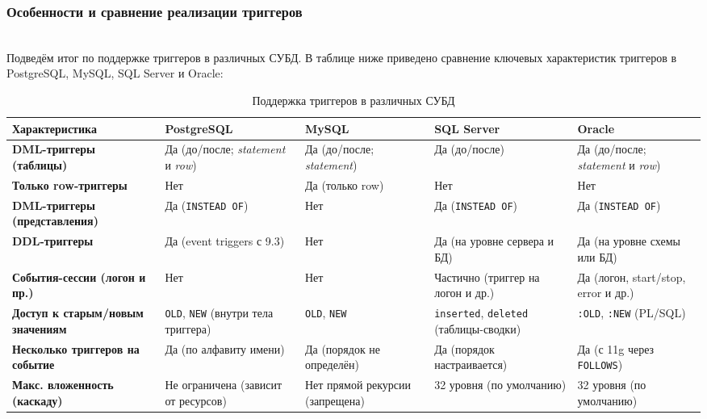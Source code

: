 \subsubsection{Особенности и сравнение реализации триггеров} ~\\

Подведём итог по поддержке триггеров в различных СУБД. В таблице ниже приведено сравнение ключевых характеристик триггеров в PostgreSQL, MySQL, SQL Server и Oracle:

\begin{table}[H]
    \centering
    \renewcommand{\arraystretch}{1.2} 
    \begin{tabular}{|>{\raggedright\arraybackslash}p{3.5cm} | p{3.2cm} | p{3cm} | p{3cm} | p{3cm}|}
        \hline
        \textbf{Характеристика} & \textbf{PostgreSQL} & \textbf{MySQL} & \textbf{SQL Server} & \textbf{Oracle} \\
        \hline
        \textbf{DML-триггеры (таблицы)} & Да (до/после; \textit{statement} и \textit{row}) & Да (до/после; \textit{statement}) & Да (до/после) & Да (до/после; \textit{statement} и \textit{row}) \\
        \hline
        \textbf{Только row-триггеры} & Нет & Да (только row) & Нет & Нет \\
        \hline
        \textbf{DML-триггеры (представления)} & Да (\texttt{INSTEAD OF}) & Нет & Да (\texttt{INSTEAD OF}) & Да (\texttt{INSTEAD OF}) \\
        \hline
        \textbf{DDL-триггеры} & Да (event triggers с 9.3) & Нет & Да (на уровне сервера и БД) & Да (на уровне схемы или БД) \\
        \hline
        \textbf{События-сессии (логон и пр.)} & Нет & Нет & Частично (триггер на логон и др.) & Да (логон, start/stop, error и др.) \\
        \hline
        \textbf{Доступ к старым/новым значениям} & \texttt{OLD}, \texttt{NEW} (внутри тела триггера) & \texttt{OLD}, \texttt{NEW} & \texttt{inserted}, \texttt{deleted} (таблицы-сводки) & \texttt{:OLD}, \texttt{:NEW} (PL/SQL) \\
        \hline
        \textbf{Несколько триггеров на событие} & Да (по алфавиту имени) \autocite{Postgresqlcom} & Да (порядок не определён) \autocite{Mysqldoc5} & Да (порядок настраивается) \autocite{MicrosoftLearnDDLTrig} & Да (с 11g через \texttt{FOLLOWS}) \autocite{oracledbdoc8} \\
        \hline
        \textbf{Макс. вложенность (каскаду)} & Не ограничена (зависит от ресурсов) \autocite{Postgresqltrig} & Нет прямой рекурсии (запрещена) & 32 уровня (по умолчанию) \autocite{MicrosoftLearnNestTrig} & 32 уровня (по умолчанию) \\
        \hline
    \end{tabular}
    \caption{Поддержка триггеров в различных СУБД}
    \label{tab:trig-comp}
\end{table}


